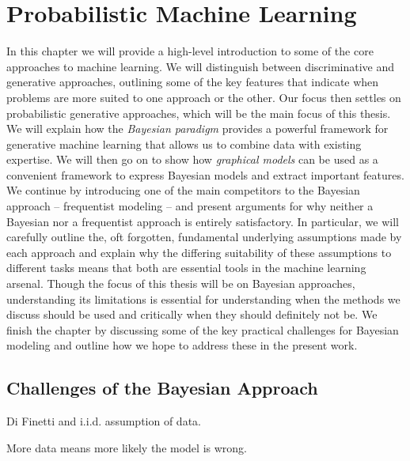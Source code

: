 %
%	


\chapter{Probabilistic Machine Learning}
\label{chp:bayes}

In this chapter we will provide a high-level introduction to  some of the core approaches to
machine learning.  We will distinguish between discriminative and generative approaches,
outlining some of the key features that indicate when problems are more suited to one approach
or the other.  Our focus then settles on probabilistic generative approaches, which
will be the main focus of this thesis.  We will explain how the \emph{Bayesian paradigm} provides
a powerful framework for generative machine learning that allows us to combine data with existing
expertise.  We will then go on to show how \emph{graphical models} can be used as a convenient
framework to express Bayesian models and extract important features.  
We continue by introducing one of the main competitors to the Bayesian approach -- frequentist
modeling -- and present arguments for why neither a Bayesian nor a frequentist approach is
entirely satisfactory.  In particular, we will carefully outline the, oft forgotten, fundamental underlying
assumptions made by each approach and explain why the differing suitability of these
assumptions to different tasks means that both are  essential tools in the machine learning
arsenal.
Though the focus of this thesis will be on Bayesian approaches, understanding its limitations
is essential for understanding when the methods we discuss should be used and critically when they
should definitely not be.  We finish the chapter by discussing some of the key practical challenges for Bayesian modeling and outline how we hope to address these in the present
work.







\section{Challenges of the Bayesian Approach}
\label{sec:bayes:challenges}

Di Finetti and i.i.d. assumption of data.

More data means more likely the model is wrong.
